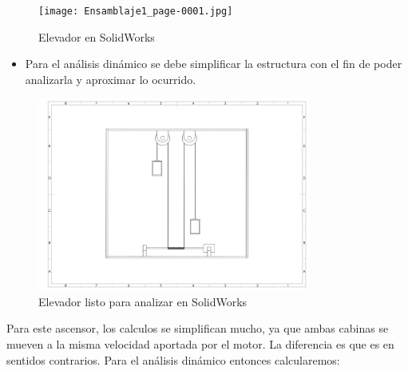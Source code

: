 \documentclass{article}
\begin{document}
\begin{figure}[H]
    \centering
    \texttt{[image: Ensamblaje1\_page-0001.jpg]}
    \caption{Elevador en SolidWorks}
    \label{fig:imagen2}
    \end{figure}
    \begin{itemize}
    \item Para el análisis dinámico se debe simplificar la estructura con el fin de poder analizarla y aproximar lo ocurrido.
    \end{itemize}
    \begin{figure}[H]
    \centering
    
    \includegraphics[width=0.8\textwidth]{plano_page-0001.jpg}
    \caption{Elevador listo para analizar en SolidWorks}
    \label{fig:imagen3}
    \end{figure}
    \newpage
    Para este ascensor, los calculos se simplifican mucho, ya que ambas cabinas se mueven a la misma velocidad
    aportada por el motor. La diferencia es que es en sentidos contrarios. Para el análisis dinámico entonces calcularemos:
\end{document}

